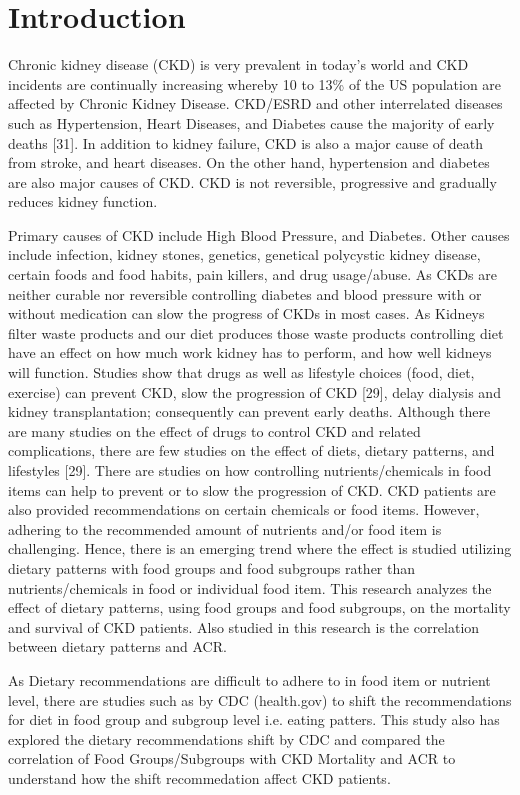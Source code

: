 \section{Introduction}
Chronic kidney disease (CKD) is very prevalent in today’s world and CKD incidents are continually increasing whereby 10 to 13\% of the US population are affected by Chronic Kidney Disease. CKD/ESRD and other interrelated diseases such as Hypertension, Heart Diseases, and Diabetes cause the majority of early  deaths [31]. In addition to kidney failure, CKD is also a major cause of death from stroke, and heart diseases. On the other hand, hypertension and diabetes are also major causes of CKD. CKD is not reversible, progressive and gradually reduces kidney function. 

\medskip

\noindent Primary causes of CKD include High Blood Pressure, and Diabetes. Other causes include infection, kidney stones, genetics, genetical polycystic kidney disease, certain foods and food habits, pain killers, and drug usage/abuse. As CKDs are neither curable nor reversible controlling diabetes and blood pressure with or without medication can slow the progress of CKDs in most cases. As Kidneys filter waste products and our diet produces those waste products controlling diet have an effect on how much work kidney has to perform, and how well kidneys will function. Studies show that drugs as well as lifestyle choices (food, diet, exercise) can prevent CKD, slow the progression of CKD [29], delay dialysis and kidney transplantation; consequently can prevent early deaths. Although there are many studies on the effect of drugs to control CKD and related complications, there are few studies on the effect of diets, dietary patterns, and lifestyles [29]. There  are studies on how controlling nutrients/chemicals in food items can help to prevent or to slow the progression of CKD. CKD patients are also provided recommendations on certain chemicals or food items. However, adhering to the recommended amount of nutrients and/or food item is challenging. Hence, there is an emerging trend where the effect is studied utilizing  dietary patterns with food groups and food subgroups rather than nutrients/chemicals in food or individual food item. This research analyzes the effect of dietary patterns, using food groups and food subgroups, on  the mortality and survival of CKD patients. Also studied in this research is the correlation between dietary patterns and ACR. 

As Dietary recommendations are difficult to adhere to in food item or nutrient level, there are studies such as by CDC (health.gov) to shift the recommendations for diet in food group and subgroup level i.e. eating patters. This study also has explored the dietary recommendations shift by CDC and compared the correlation of Food Groups/Subgroups with CKD Mortality and ACR to understand how the shift recommedation affect CKD patients.

